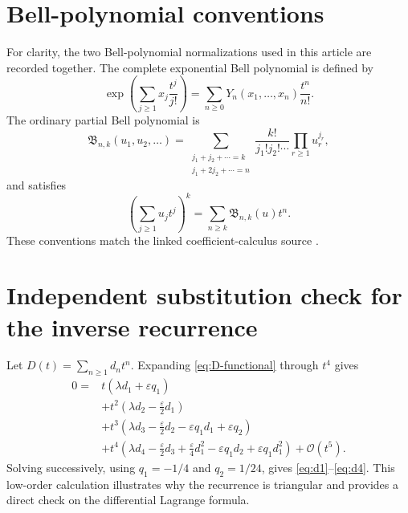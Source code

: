 \documentclass[11pt]{article}
\theoremstyle{definition}
\theoremstyle{remark}
\newcommand{\eps}{\varepsilon}
\newcommand{\lam}{\lambda}
\newcommand{\BellOrd}{\mathfrak B}
\newcommand{\bigO}{\mathcal O}
\begin{document}
\section{Bell-polynomial conventions}\label{app:Bell}

For clarity, the two Bell-polynomial normalizations used in this article are recorded together.  The complete exponential Bell polynomial is defined by
\[
 \exp\!\left(\sum_{j\ge1}x_j\frac{t^j}{j!}\right)
 =\sum_{n\ge0}Y_n(x_1,\ldots,x_n)\frac{t^n}{n!}.
\]
The ordinary partial Bell polynomial is
\[
 \BellOrd_{n,k}(u_1,u_2,\ldots)
 =\sum_{\substack{j_1+j_2+\cdots=k\\
                   j_1+2j_2+\cdots=n}}
   \frac{k!}{j_1!j_2!\cdots}\prod_{r\ge1}u_r^{j_r},
\]
and satisfies
\[
 \left(\sum_{j\ge1}u_jt^j\right)^k
 =\sum_{n\ge k}\BellOrd_{n,k}(u)t^n.
\]
These conventions match the linked coefficient-calculus source \cite{CoeffCalculus}.

\section{Independent substitution check for the inverse recurrence}

Let $D(t)=\sum_{n\ge1}d_nt^n$.  Expanding \eqref{eq:D-functional} through $t^4$ gives
\begin{align*}
 0={}&t\left(\lam d_1+\eps q_1\right)\\
 &+t^2\left(\lam d_2-\frac\eps2d_1\right)\\
 &+t^3\left(\lam d_3-\frac\eps2d_2-\eps q_1d_1+\eps q_2\right)\\
 &+t^4\left(\lam d_4-\frac\eps2d_3+\frac\eps4d_1^2
 -\eps q_1d_2+\eps q_1d_1^2\right)+\bigO(t^5).
\end{align*}
Solving successively, using $q_1=-1/4$ and $q_2=1/24$, gives \eqref{eq:d1}--\eqref{eq:d4}.  This low-order calculation illustrates why the recurrence is triangular and provides a direct check on the differential Lagrange formula.
\end{document}
